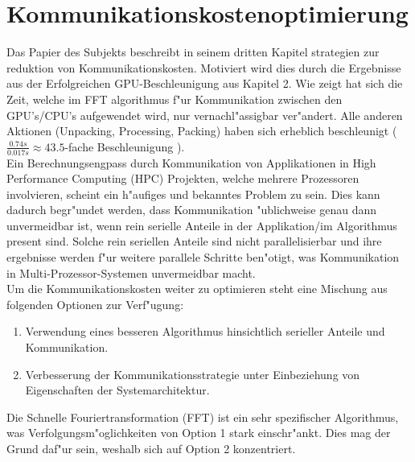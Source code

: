 \section{Kommunikationskostenoptimierung}
Das Papier des Subjekts \cite{mainpaper} beschreibt in seinem dritten Kapitel strategien zur reduktion von Kommunikationskosten. Motiviert wird dies durch die Ergebnisse aus der Erfolgreichen GPU-Beschleunigung aus Kapitel 2.
Wie \cite[Abb. 3]{mainpaper} zeigt hat sich die Zeit, welche im FFT algorithmus f"ur Kommunikation zwischen den GPU's/CPU's aufgewendet wird, nur vernachl"assigbar ver"andert. Alle anderen Aktionen (Unpacking, Processing, Packing) haben sich erheblich beschleunigt ($ \frac{0.74s}{0.017s} \approx 43.5$-fache Beschleunigung ).\\

Ein Berechnungsengpass durch Kommunikation von Applikationen in High Performance Computing (HPC) Projekten, welche mehrere Prozessoren involvieren, scheint ein h"aufiges und bekanntes Problem zu sein.
Dies kann dadurch begr"undet werden, dass Kommunikation "ublichweise genau dann unvermeidbar ist, wenn rein serielle Anteile in der Applikation/im Algorithmus present sind. Solche rein seriellen Anteile sind nicht parallelisierbar und ihre ergebnisse werden f"ur weitere parallele Schritte ben"otigt, was Kommunikation in Multi-Prozessor-Systemen unvermeidbar macht.\\
Um die Kommunikationskosten weiter zu optimieren steht eine Mischung aus folgenden Optionen zur Verf"ugung:
\begin{enumerate}
	\item Verwendung eines besseren Algorithmus hinsichtlich serieller Anteile und Kommunikation.
	\item Verbesserung der Kommunikationsstrategie unter Einbeziehung von Eigenschaften der Systemarchitektur.
\end{enumerate}

Die Schnelle Fouriertransformation (FFT) ist ein sehr spezifischer Algorithmus, was Verfolgungsm"oglichkeiten von Option 1 stark einschr"ankt. Dies mag der Grund daf"ur sein, weshalb sich \cite{mainpaper} auf Option 2 konzentriert.

